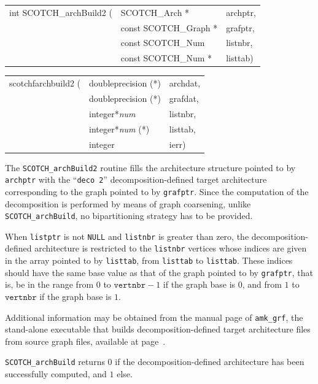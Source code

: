 \begin{itemize}
\progsyn

{\tt\begin{tabular}{l@{}ll}
int SCOTCH\_archBuild2 ( & SCOTCH\_Arch *        & archptr, \\
                         & const SCOTCH\_Graph * & grafptr, \\
                         & const SCOTCH\_Num     & listnbr, \\
                         & const SCOTCH\_Num *   & listtab)
\end{tabular}}

{\tt\begin{tabular}{l@{}ll}
scotchfarchbuild2 ( & doubleprecision (*)   & archdat, \\
                    & doubleprecision (*)   & grafdat, \\
                    & integer*{\it num}     & listnbr, \\
                    & integer*{\it num} (*) & listtab, \\
                    & integer               & ierr)
\end{tabular}}

\progdes

The {\tt SCOTCH\_archBuild2} routine fills the architecture structure
pointed to by {\tt archptr} with the ``\texttt{deco 2}''
decomposition-defined target architecture corresponding to the graph
pointed to by {\tt grafptr}. Since the computation of the
decomposition is performed by means of graph coarsening,
unlike {\tt SCOTCH\_\lbt arch\lbt Build}, no bipartitioning strategy
has to be provided.

When {\tt listptr} is not {\tt NULL} and {\tt listnbr} is greater than
zero, the decomposition-defined architecture is restricted to the
{\tt listnbr} vertices whose indices are given in the array pointed to
by {\tt listtab}, from {\tt listtab\lbt [0]} to {\tt listtab\lbt
[listnbr - 1]}. These indices should have the same base value as that
of the graph pointed to by {\tt grafptr}, that is, be in the
range from $0$ to $\mathtt{vertnbr} - 1$ if the graph base is
$0$, and from $1$ to $\mathtt{vertnbr}$ if the graph base is $1$.

Additional information may be obtained from the manual page of
{\tt amk\_\lbt grf}, the stand-alone executable that builds
decomposition-defined target architecture files from source graph
files, available at page~\pageref{sec-prog-amkgrf}.

\progret

{\tt SCOTCH\_archBuild} returns $0$ if the decomposition-defined
architecture has been successfully computed, and $1$ else.
\end{itemize}

